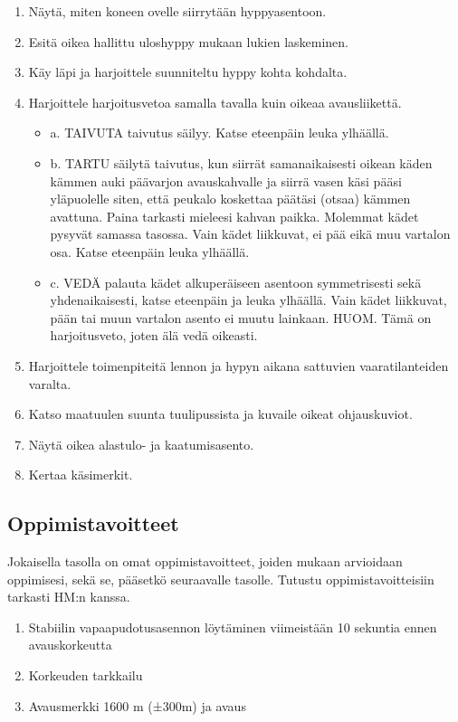 \begin{enumerate}[label=\bfseries \arabic*)]
\item  Näytä, miten koneen ovelle siirrytään hyppyasentoon. 
\item  Esitä oikea hallittu uloshyppy mukaan lukien laskeminen. 
\item  Käy läpi ja harjoittele suunniteltu hyppy kohta kohdalta. 
\item  Harjoittele harjoitusvetoa samalla tavalla kuin oikeaa avausliikettä. 
	\begin{itemize}
	\item  a. TAIVUTA taivutus säilyy. Katse eteenpäin leuka ylhäällä. 
	\item  b. TARTU säilytä taivutus, kun siirrät samanaikaisesti oikean käden kämmen auki päävarjon avauskahvalle ja siirrä vasen käsi pääsi yläpuolelle siten, että peukalo koskettaa päätäsi (otsaa) kämmen avattuna. Paina tarkasti mieleesi kahvan paikka. Molemmat kädet pysyvät samassa tasossa. Vain kädet liikkuvat, ei pää eikä muu vartalon osa. Katse eteenpäin leuka ylhäällä. 
	\item  c. VEDÄ palauta kädet alkuperäiseen asentoon symmetrisesti sekä yhdenaikaisesti, katse eteenpäin ja leuka ylhäällä. Vain kädet liikkuvat, pään tai muun vartalon asento ei muutu lainkaan. HUOM. Tämä on harjoitusveto, joten älä vedä oikeasti.  
	\end{itemize}
\item  Harjoittele toimenpiteitä lennon ja hypyn aikana sattuvien vaaratilanteiden varalta. 
\item  Katso maatuulen suunta tuulipussista ja kuvaile oikeat ohjauskuviot. 
\item  Näytä oikea alastulo- ja kaatumisasento. 
\item  Kertaa käsimerkit. 
\end{enumerate}
\subsection{ Oppimistavoitteet }
\label{nova-alkeiskoulutuksen-suoritukset-oppimistavoitteet}


Jokaisella tasolla on omat oppimistavoitteet, joiden mukaan arvioidaan oppimisesi, sekä se, pääsetkö seuraavalle tasolle. Tutustu oppimistavoitteisiin tarkasti HM:n kanssa. 

\begin{enumerate}[label=\bfseries \arabic*)]
\item  Stabiilin vapaapudotusasennon löytäminen viimeistään 10 sekuntia ennen avauskorkeutta 
\item  Korkeuden tarkkailu 
\item  Avausmerkki 1600 m (±300m) ja avaus 
\end{enumerate}
